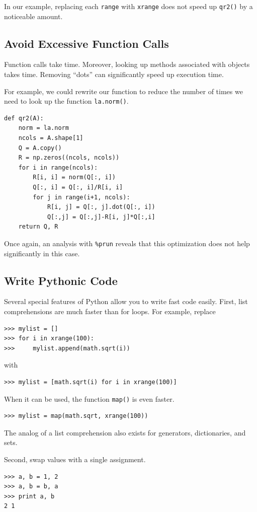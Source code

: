 In our example, replacing each \texttt{range} with \texttt{xrange} does not speed up \texttt{qr2()} by a noticeable amount.

\subsection*{Avoid Excessive Function Calls}
Function calls take time.
Moreover, looking up methods associated with objects takes time.
Removing ``dots'' can significantly speed up execution time.

For example, we could rewrite our function to reduce the number of times we need to look up the function \texttt{la.norm()}.

\begin{lstlisting}
def qr2(A):
    norm = la.norm
    ncols = A.shape[1]
    Q = A.copy()
    R = np.zeros((ncols, ncols))
    for i in range(ncols):
        R[i, i] = norm(Q[:, i])
        Q[:, i] = Q[:, i]/R[i, i]
        for j in range(i+1, ncols):
            R[i, j] = Q[:, j].dot(Q[:, i])
            Q[:,j] = Q[:,j]-R[i, j]*Q[:,i]
    return Q, R
\end{lstlisting}
Once again, an analysis with \texttt{\%prun} reveals that this optimization does not help significantly in this case.


\subsection*{Write Pythonic Code}
Several special features of Python allow you to write fast code easily.
First, list comprehensions are much faster than for loops.
For example, replace
\begin{lstlisting}
>>> mylist = []
>>> for i in xrange(100):
>>>     mylist.append(math.sqrt(i))
\end{lstlisting}
with 
\begin{lstlisting}
>>> mylist = [math.sqrt(i) for i in xrange(100)]
\end{lstlisting}
When it can be used, the function \texttt{map()} is even faster.
\begin{lstlisting}
>>> mylist = map(math.sqrt, xrange(100))
\end{lstlisting}
The analog of a list comprehension also exists for generators, dictionaries, and sets.

Second, swap values with a single assignment.
\begin{lstlisting}
>>> a, b = 1, 2
>>> a, b = b, a
>>> print a, b
2 1
\end{lstlisting}

